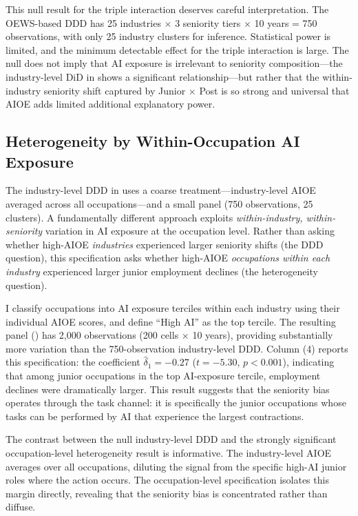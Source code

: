 \documentclass[12pt]{article}
\begin{document}
This null result for the triple interaction deserves careful interpretation. The OEWS-based DDD has 25 industries $\times$ 3 seniority tiers $\times$ 10 years = 750 observations, with only 25 industry clusters for inference. Statistical power is limited, and the minimum detectable effect for the triple interaction is large. The null does not imply that AI exposure is irrelevant to seniority composition---the industry-level DiD in  shows a significant relationship---but rather that the within-industry seniority shift captured by Junior $\times$ Post is so strong and universal that AIOE adds limited additional explanatory power.

\subsection{Heterogeneity by Within-Occupation AI Exposure}

The industry-level DDD in  uses a coarse treatment---industry-level AIOE averaged across all occupations---and a small panel (750 observations, 25 clusters). A fundamentally different approach exploits \emph{within-industry, within-seniority} variation in AI exposure at the occupation level. Rather than asking whether high-AIOE \emph{industries} experienced larger seniority shifts (the DDD question), this specification asks whether high-AIOE \emph{occupations within each industry} experienced larger junior employment declines (the heterogeneity question).

I classify occupations into AI exposure terciles within each industry using their individual AIOE scores, and define ``High AI'' as the top tercile. The resulting panel () has 2,000 observations (200 cells $\times$ 10 years), providing substantially more variation than the 750-observation industry-level DDD.  Column (4) reports this specification: the coefficient $\hat{\delta}_1 = -0.27$ ($t = -5.30$, $p < 0.001$), indicating that among junior occupations in the top AI-exposure tercile, employment declines were dramatically larger. This result suggests that the seniority bias operates through the task channel: it is specifically the junior occupations whose tasks can be performed by AI that experience the largest contractions.

The contrast between the null industry-level DDD and the strongly significant occupation-level heterogeneity result is informative. The industry-level AIOE averages over all occupations, diluting the signal from the specific high-AI junior roles where the action occurs. The occupation-level specification isolates this margin directly, revealing that the seniority bias is concentrated rather than diffuse.
\end{document}
